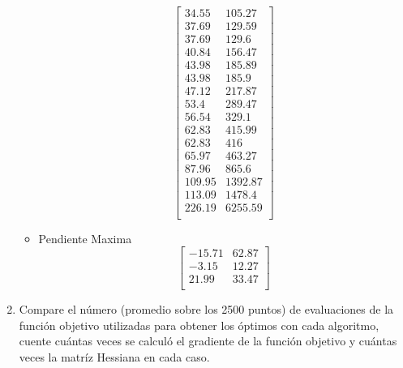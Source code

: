 \documentclass[12pt]{article}
\begin{document}
\begin{enumerate}
\begin{itemize}
\[\begin{bmatrix}
              34.55          &          105.27\\
              37.69          &          129.59\\
              37.69          &           129.6\\
              40.84          &          156.47\\
              43.98          &          185.89\\
              43.98          &           185.9\\
              47.12          &          217.87\\
               53.4          &          289.47\\
              56.54          &           329.1\\
              62.83          &          415.99\\
              62.83          &             416\\
              65.97          &          463.27\\
              87.96          &           865.6\\
             109.95          &         1392.87\\
             113.09          &          1478.4\\
             226.19          &         6255.59\\
        \end{bmatrix}\]
        \item Pendiente Maxima 
        \[\begin{bmatrix}
            -15.71           &          62.87 \\
            -3.15            &         12.27\\
            21.99            &         33.47\\
        \end{bmatrix}\]
    \end{itemize}
    \item Compare el número (promedio sobre los 2500 puntos) de evaluaciones
    de la función objetivo utilizadas para obtener los óptimos con cada
    algoritmo, cuente cuántas veces se calculó el gradiente de la función
    objetivo y cuántas veces la matríz Hessiana en cada caso.


\end{enumerate}
\end{document}
